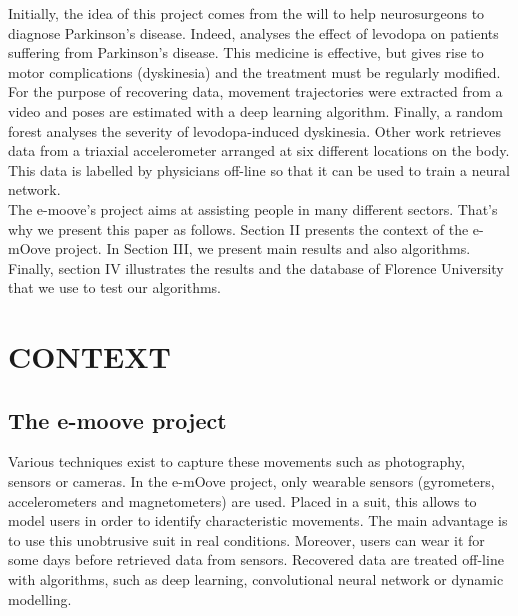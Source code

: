 \documentclass[letterpaper, 10 pt, conference]{ieeeconf}  %
\begin{document}
Initially, the idea of this project comes from the will to help neurosurgeons to diagnose Parkinson's disease. Indeed, \cite{li18} analyses the effect of levodopa on patients suffering from Parkinson's disease. This medicine is effective, but gives rise to motor complications (dyskinesia) and the treatment must be regularly modified. For the purpose of recovering data, movement trajectories were extracted from a video and poses are estimated with a deep learning algorithm. Finally, a random forest analyses the severity of levodopa-induced dyskinesia. Other work \cite{kei03} retrieves data from a triaxial accelerometer arranged at six different locations on the body. This data is labelled by physicians off-line so that it can be used to train a neural network.\\
The e-moove's project aims at assisting people in many different sectors. That's why we present this paper as follows. Section II presents the context of the e-mOove project. In Section III, we present main results and also algorithms. Finally, section IV illustrates the results and the database of Florence University that we use to test our algorithms.


\section{CONTEXT}

\subsection{The e-moove project}

Various techniques exist to capture these movements such as photography, sensors or cameras. In the e-mOove project, only wearable sensors (gyrometers, accelerometers and magnetometers) are used. Placed in a suit, this allows to model users in order to identify characteristic movements. The main advantage is to use this unobtrusive suit in real conditions. Moreover, users can wear it for some days before retrieved data from sensors. Recovered data are treated off-line with algorithms, such as deep learning, convolutional neural network or dynamic modelling. 
\end{document}
